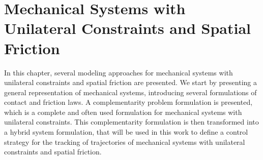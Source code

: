 \documentclass[../DC2017114Bouma.tex]{subfiles}
\begin{document}
\graphicspath{{02_Material/img/}}
\renewcommand{\chaptermark}[1]{\markboth{\thechapter.\ #1}{}}
\renewcommand{\sectionmark}[1]{\markright{#1}{}}
\pagestyle{fancyreport}
\cleartooddpage
\pagestyle{fancyreport}
\chapter{Mechanical Systems with Unilateral Constraints and Spatial Friction}\label{ch:model}
%
%
%
%
%
%
%
%
%
%
%
%
%
%
%
%
%
%
%
%
In this chapter, several modeling approaches for mechanical systems with unilateral constraints and spatial friction are presented. We start by presenting a general representation of mechanical systems, introducing several formulations of contact and friction laws. A complementarity problem formulation is presented, which is a complete and often used formulation for mechanical systems with unilateral constraints. This complementarity formulation is then transformed into a hybrid system formulation, that will be used in this work to define a control strategy for the tracking of trajectories of mechanical systems with unilateral constraints and spatial friction.
\end{document}
